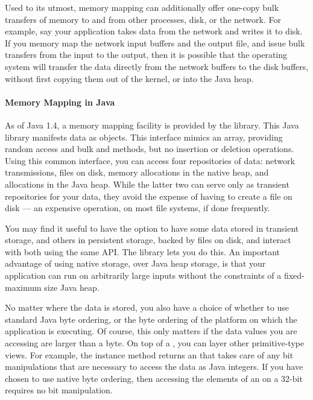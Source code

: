 Used to its utmost, memory mapping can additionally offer one-copy bulk
transfers of memory to and from other processes, disk, or the network. For
example, say your application takes data from the network and writes it to
disk. If you memory map the network input buffers and the output file, and issue
bulk transfers from the input to the output, then it is possible that the
operating system will transfer the data directly from the network buffers to the
disk buffers, without first copying them out of the kernel, or into the
Java heap.

\paragraph{Memory Mapping in Java}
As of Java 1.4, a memory mapping facility is provided by the 
library. This Java library manifests data as  objects. This
interface mimics an array, providing random access and bulk  and
 methods, but no insertion or deletion operations. Using this common
interface, you can access four repositories of data: network transmissions, files
on disk, memory allocations in the native heap, and allocations in the Java heap.
While the latter two can serve only as transient repositories for your data, they
avoid the expense of having to create a file on disk --- an expensive operation,
on most file systems, if done frequently.

You may find it useful to have the option to have some data stored in transient
storage, and others in persistent storage, backed by files on disk, and interact
with both using the same API. The  library lets you do this. An
important advantage of using native  storage, over Java heap
storage, is that your application can run on arbitrarily large inputs without the
constraints of a fixed-maximum size Java heap.

No matter where the data is stored, you also have a choice of whether to use
standard Java byte ordering, or the byte ordering of the platform on which the
application is executing. Of course, this only matters if the data values you are
accessing are larger than a byte. On top of a , you can layer
other primitive-type views. For example, the instance method
 returns an  that takes care of
any bit manipulations that are necessary to access the data as Java integers. If
you have chosen to use native byte ordering, then accessing the elements of an
 on a 32-bit \jre requires no bit manipulation.

